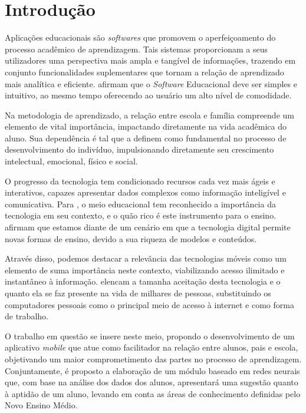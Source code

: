 

\setlength{\afterchapskip}{1.5cm minus \baselineskip}


\chapter{Introdução}
\label{cha:motivacao}
Aplicações educacionais são \textit{softwares} que promovem o aperfeiçoamento do processo acadêmico de aprendizagem. Tais sistemas proporcionam a seus utilizadores uma perspectiva mais ampla e tangível de informações, trazendo em conjunto funcionalidades suplementares que tornam a relação de aprendizado mais analítica e eficiente.  afirmam que o \textit{Software} Educacional deve ser simples e intuitivo, ao mesmo tempo oferecendo ao usuário um alto nível de comodidade.

Na metodologia de aprendizado, a relação entre escola e família compreende um elemento de vital importância, impactando diretamente na vida acadêmica do aluno. Sua dependência é tal que  a definem como fundamental no processo de desenvolvimento do indivíduo, impulsionando diretamente seu crescimento intelectual, emocional, físico e social.

O progresso da tecnologia tem condicionado recursos cada vez mais ágeis e interativos, capazes apresentar dados complexos como informação inteligível e comunicativa. Para , o meio educacional tem reconhecido a importância da tecnologia em seu contexto, e o quão rico é este instrumento para o ensino.  afirmam que estamos diante de um cenário em que a tecnologia digital permite novas formas de ensino, devido a sua riqueza de modelos e conteúdos.

Através disso, podemos destacar a relevância das tecnologias móveis como um elemento de suma importância neste contexto, viabilizando acesso ilimitado e instantâneo à informação.  elencam a tamanha aceitação desta tecnologia e o quanto ela se faz presente na vida de milhares de pessoas, substituindo os computadores pessoais como o principal meio de acesso à internet e como forma de trabalho.

O trabalho em questão se insere neste meio, propondo o desenvolvimento de um aplicativo \textit{mobile} que atue como facilitador na relação entre alunos, pais e escola, objetivando um maior comprometimento das partes no processo de aprendizagem. Conjuntamente, é proposto a elaboração de um módulo baseado em redes neurais que, com base na análise dos dados dos alunos, apresentará uma sugestão quanto à aptidão de um aluno, levando em conta as áreas de conhecimento definidas pelo Novo Ensino Médio.

